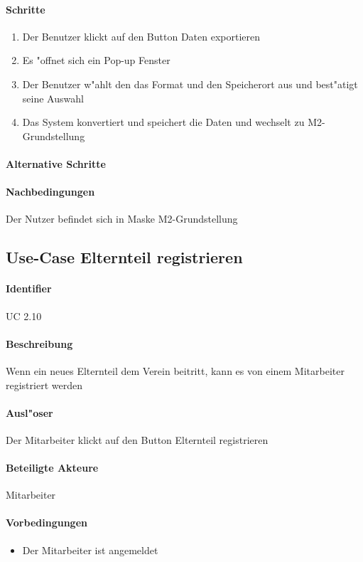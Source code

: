   \paragraph{Schritte}
  \begin{enumerate}
   \item Der Benutzer klickt auf den Button \dq Daten exportieren \dq
   \item Es "offnet sich ein Pop-up Fenster
   \item Der Benutzer w"ahlt den das Format und den Speicherort aus und best"atigt seine Auswahl
   \item Das System konvertiert und speichert die Daten und wechselt zu M2-Grundstellung
  \end{enumerate}
  \paragraph{Alternative Schritte}
  \paragraph{Nachbedingungen}
  Der Nutzer befindet sich in Maske M2-Grundstellung

  
  \newpage
 \subsection{Use-Case Elternteil registrieren}
  \paragraph{Identifier}
  UC 2.10
  \paragraph{Beschreibung}
  Wenn ein neues Elternteil dem Verein beitritt, kann es von einem Mitarbeiter registriert werden
  \paragraph{Ausl"oser}
  Der Mitarbeiter klickt auf den Button \dq Elternteil registrieren\dq
  \paragraph{Beteiligte Akteure}   \leavevmode \newline
    Mitarbeiter
  \paragraph{Vorbedingungen}
  \begin{itemize}
   \item Der Mitarbeiter ist angemeldet
  \end{itemize}
